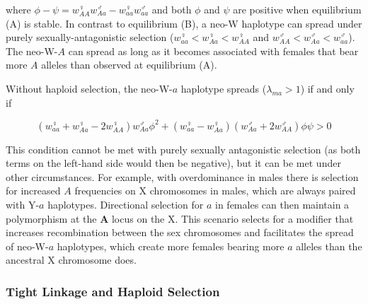 \documentclass[12pt]{article}
\begin{document}
\noindent  
where $\phi-\psi=w_{AA}^\female w_{Aa}^\male-w_{aa}^\female w_{aa}^\male$ and both $\phi$ and $\psi$ are positive when equilibrium (A) is stable. 
In contrast to equilibrium (B), a neo-W haplotype can spread under purely sexually-antagonistic selection  ($w_{aa}^\female<w_{Aa}^\female<w_{AA}^\female$ and $w_{AA}^\male<w_{Aa}^\male<w_{aa}^\male$).
The neo-W-$A$ can spread as long as it becomes associated with females that bear more $A$ alleles than observed at equilibrium (A). 

Without haploid selection, the neo-W-$a$ haplotype spreads ($\lambda_{ma}>1$) if and only if

\begin{equation}\label{eq:BeqWaspread}
(w_{aa}^\female + w_{Aa}^\female-2w_{AA}^\female)w_{Aa}^\male \phi^2 + (w_{aa}^\female-w_{Aa}^\female)(w_{Aa}^\male+2w_{AA}^\male) \phi \psi >0
\end{equation}

\noindent
This condition cannot be met with purely sexually antagonistic selection (as both terms on the left-hand side would then be negative), but it can be met under other circumstances. 
For example, with overdominance in males there is selection for increased $A$ frequencies on X chromosomes in males, which are always paired with Y-$a$ haplotypes.
Directional selection for $a$ in females can then maintain a polymorphism at the $\textbf{A}$ locus on the X.
This scenario selects for a modifier that increases recombination between the sex chromosomes \citep[e.g., blue region of Figure 2d in][]{Otto2014} and facilitates the spread of neo-W-$a$ haplotypes, which create more females bearing more $a$ alleles than the ancestral X chromosome does. 

\subsubsection*{Tight Linkage and Haploid Selection}
\end{document}
